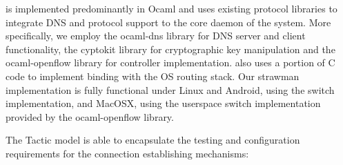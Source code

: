 \signpost is implemented predominantly in Ocaml and uses existing protocol
libraries to integrate DNS and \of protocol support to the core daemon of the
system.  More specifically, we employ the ocaml-dns library for DNS server and
client functionality, the cyptokit library for cryptographic key manipulation
and the ocaml-openflow library for \of controller implementation. \signpost also
uses a portion of C code to implement binding with the OS routing stack. Our
strawman implementation is fully functional under Linux and Android, using the
\ovs switch implementation, and MacOSX, using the userspace switch
implementation provided by the ocaml-openflow library.

The \signpost Tactic model is able to encapsulate the testing and configuration
requirements for the connection establishing mechanisms: 

